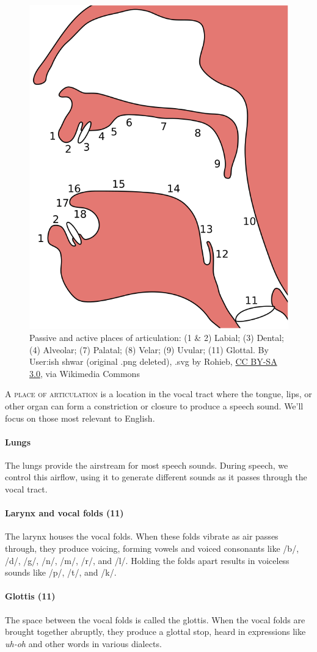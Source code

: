 \begin{figure}
    \centering
    \includegraphics[width=0.5\linewidth]{figures/Places_of_articulation.svg.png}
    \caption{Passive and active places of articulation: (1 \& 2) Labial; (3) Dental; (4) Alveolar; (7) Palatal; (8) Velar; (9) Uvular; (11) Glottal. By User:ish shwar (original .png deleted), .svg by Rohieb, \href{http://creativecommons.org/licenses/by-sa/3.0/}{CC BY-SA 3.0}, via Wikimedia Commons}
    \label{fig:articulation}
\end{figure}

A \textsc{place of articulation} is a location in the vocal tract where the tongue, lips, or other organ can form a constriction or closure to produce a speech sound. We'll focus on those most relevant to English.

\paragraph*{Lungs} The lungs provide the airstream for most speech sounds. During speech, we control this airflow, using it to generate different sounds as it passes through the vocal tract.

\paragraph*{Larynx and vocal folds (11)} The larynx houses the vocal folds. When these folds vibrate as air passes through, they produce voicing, forming vowels and voiced consonants like /b/, /d/, /g/, /n/, /m/, /r/, and /l/. Holding the folds apart results in voiceless sounds like /p/, /t/, and /k/.

\paragraph*{Glottis (11)} The space between the vocal folds is called the glottis. When the vocal folds are brought together abruptly, they produce a glottal stop, heard in expressions like \textit{uh-oh} and other words in various dialects.

